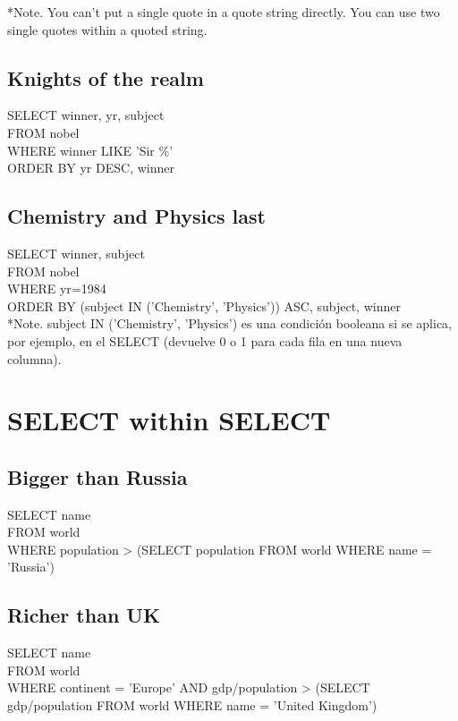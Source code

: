 \documentclass[10pt, oneside]{article}
\begin{document}
\color{blue}*Note. You can't put a single quote in a quote string directly. You can use two single quotes within a quoted string.\color{black}

\subsection{Knights of the realm}

SELECT winner, yr, subject\\
FROM nobel\\
WHERE winner LIKE 'Sir \%'\\
ORDER BY yr DESC, winner\\

\subsection{Chemistry and Physics last}
\color{red}
SELECT winner, subject \\
FROM nobel\\
WHERE yr=1984\\
ORDER BY (subject IN ('Chemistry', 'Physics')) ASC, subject, winner\\

\color{blue}
*Note. subject IN ('Chemistry', 'Physics') es una condición booleana si se aplica, por ejemplo, en el SELECT (devuelve 0 o 1 para cada fila en una nueva columna). \color{black}

\section{SELECT within SELECT}

\subsection{Bigger than Russia}

SELECT name\\
FROM world\\
WHERE population > (\color{red}SELECT population FROM world WHERE name = 'Russia'\color{black})\\

\subsection{Richer than UK}

SELECT name\\
FROM world\\
WHERE continent = 'Europe' AND gdp/population > (SELECT gdp/population FROM world WHERE name = 'United Kingdom')\\
\end{document}
